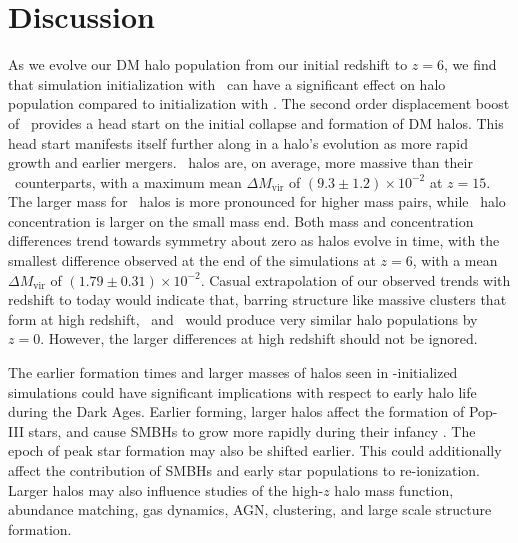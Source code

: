 
%
%

\section{Discussion}
\label{sec:2lpt--discussion}







As we evolve our DM halo population from our initial redshift to $z = 6$, we find that simulation initialization with \lpt\ can have a significant effect on halo population compared to initialization with \za.  The second order displacement boost of \lpt\ provides a head start on the initial collapse and formation of DM halos.  This head start manifests itself further along in a halo's evolution as more rapid growth and earlier mergers.  \lpt\ halos are, on average, more massive than their \za\ counterparts, with a maximum mean $\Delta M_{\mathrm{vir}}$ of $(9.3 \pm 1.2) \times 10^{-2}$ at $z = 15$.  The larger mass for \lpt\ halos is more pronounced for higher mass pairs, while \lpt\ halo concentration is larger on the small mass end.  Both mass and concentration differences trend towards symmetry about zero as halos evolve in time, with the smallest difference observed at the end of the simulations at $z = 6$, with a mean $\Delta M_{\mathrm{vir}}$ of $(1.79 \pm 0.31) \times 10^{-2}$.  Casual extrapolation of our observed trends with redshift to today would indicate that, barring structure like massive clusters that form at high redshift, \lpt\ and \za\ would produce very similar halo populations by $z = 0$.  However, the larger differences at high redshift should not be ignored.






The earlier formation times and larger masses of halos seen in \lpt-initialized simulations could have significant implications with respect to early halo life during the Dark Ages.  Earlier forming, larger halos affect the formation of Pop-III stars, and cause SMBHs to grow more rapidly during their infancy \citep{2012ApJ...761L...8H}.  The epoch of peak star formation may also be shifted earlier.  This could additionally affect the contribution of SMBHs and early star populations to re-ionization.  Larger halos may also influence studies of the high-$z$ halo mass function, abundance matching, gas dynamics, AGN, clustering, and large scale structure formation.

